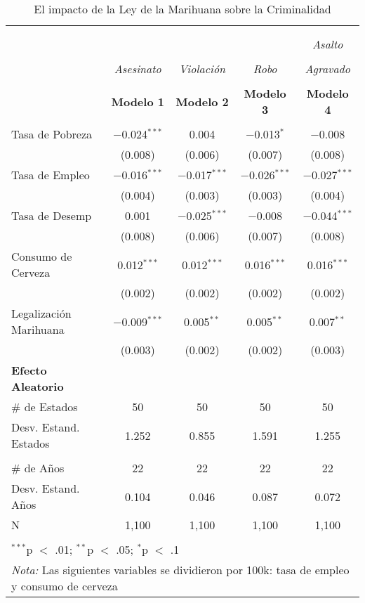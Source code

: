 \documentclass[11pt,]{article}
\begin{document}
\begin{table}[!htbp] \centering 
  \caption{El impacto de la Ley de la Marihuana sobre la Criminalidad} 
  \label{tab:mdl} 
\small 
\begin{tabular}{@{\extracolsep{5pt}}lcccc} 
\\[-1.8ex]\hline \\[-1.8ex] 
\\[-1.8ex] &  &  &  & \emph{Asalto} \\
\\[-1.8ex] & \emph{Asesinato} & \emph{Violación} & \emph{Robo} & \emph{Agravado}\\ 
\\[-1.8ex] & \textbf{Modelo 1} & \textbf{Modelo 2} & \textbf{Modelo 3} & \textbf{Modelo 4}\\ 
\hline \\[-1.8ex] 
 Tasa de Pobreza & $-$0.024$^{***}$ & 0.004 & $-$0.013$^{*}$ & $-$0.008 \\ 
  & (0.008) & (0.006) & (0.007) & (0.008) \\ 
  Tasa de Empleo & $-$0.016$^{***}$ & $-$0.017$^{***}$ & $-$0.026$^{***}$ & $-$0.027$^{***}$ \\ 
  & (0.004) & (0.003) & (0.003) & (0.004) \\ 
  Tasa de Desemp & 0.001 & $-$0.025$^{***}$ & $-$0.008 & $-$0.044$^{***}$ \\ 
  & (0.008) & (0.006) & (0.007) & (0.008) \\ 
  Consumo de Cerveza & 0.012$^{***}$ & 0.012$^{***}$ & 0.016$^{***}$ & 0.016$^{***}$ \\ 
  & (0.002) & (0.002) & (0.002) & (0.002) \\ 
  Legalización Marihuana & $-$0.009$^{***}$ & 0.005$^{**}$ & 0.005$^{**}$ & 0.007$^{**}$ \\ 
  & (0.003) & (0.002) & (0.002) & (0.003) \\ 
\hline
{\bf Efecto Aleatorio} & & & &  \\
\hline
\# de Estados & 50 & 50 & 50 & 50 \\
Desv. Estand. Estados &  1.252 & 0.855 & 1.591 & 1.255 \\
\\
\# de Años & 22 & 22 & 22 & 22 \\
Desv. Estand. Años &  0.104 & 0.046 & 0.087 & 0.072 \\
\hline
 N & 1,100 & 1,100 & 1,100 & 1,100 \\ 
\hline \\[-1.8ex] 
\multicolumn{5}{l}{$^{***}$p $<$ .01; $^{**}$p $<$ .05; $^{*}$p $<$ .1} \\ 
\multicolumn{5}{l}{\textit{Nota:}  Las siguientes variables se dividieron por 100k: tasa de empleo y consumo de cerveza} \\ 
\end{tabular} 
\end{table}
\end{document}

